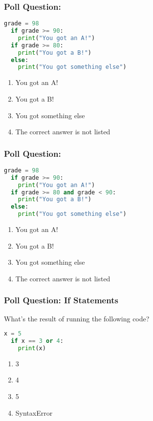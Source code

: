 \documentclass{beamer}
\begin{document}
%
%
\begin{frame}[fragile]
  \frametitle{Poll Question: }

  \begin{lstlisting}[language=Python, autogobble]
  grade = 98
  if grade >= 90:
    print("You got an A!")
  if grade >= 80:
    print("You got a B!")
  else:
    print("You got something else")
  \end{lstlisting}
  \vfill
  \begin{enumerate}[A]
    \item You got an A\@!
    \item You got a B\@!
    \item You got something else
    \item The correct answer is not listed
  \end{enumerate}
\end{frame}

%
%
\begin{frame}[fragile]
  \frametitle{Poll Question: }

  \begin{lstlisting}[language=Python, autogobble]
  grade = 98
  if grade >= 90:
    print("You got an A!")
  if grade >= 80 and grade < 90:
    print("You got a B!")
  else:
    print("You got something else")
  \end{lstlisting}
  \vfill
  \begin{enumerate}[A]
    \item You got an A\@!
    \item You got a B\@!
    \item You got something else
    \item The correct answer is not listed
  \end{enumerate}
\end{frame}

%
%
\begin{frame}[fragile]
  \frametitle{Poll Question: If Statements}
  What's the result of running the following code?
  \begin{lstlisting}[language=Python, autogobble]
  x = 5
  if x == 3 or 4:
    print(x)
  \end{lstlisting}
  \vfill
  \begin{enumerate}[A]
    \item 3
    \item 4
    \item 5
    \item SyntaxError
  \end{enumerate}
\end{frame}
\end{document}
